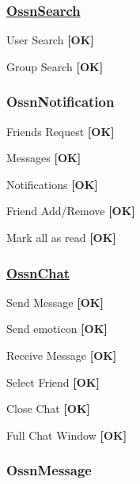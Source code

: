 \subsubsection*{\hyperlink{class_ossn_search}{Ossn\+Search}}


\begin{DoxyItemize}
\item User Search {\bfseries \mbox{[}OK\mbox{]}}
\item Group Search {\bfseries \mbox{[}OK\mbox{]}}
\end{DoxyItemize}

\subsubsection*{Ossn\+Notification}


\begin{DoxyItemize}
\item Friends Request {\bfseries \mbox{[}OK\mbox{]}}
\item Messages {\bfseries \mbox{[}OK\mbox{]}}
\item Notifications {\bfseries \mbox{[}OK\mbox{]}}
\item Friend Add/\+Remove {\bfseries \mbox{[}OK\mbox{]}}
\item Mark all as read {\bfseries \mbox{[}OK\mbox{]}}
\end{DoxyItemize}

\subsubsection*{\hyperlink{class_ossn_chat}{Ossn\+Chat}}


\begin{DoxyItemize}
\item Send Message {\bfseries \mbox{[}OK\mbox{]}}
\item Send emoticon {\bfseries \mbox{[}OK\mbox{]}}
\item Receive Message {\bfseries \mbox{[}OK\mbox{]}}
\item Select Friend {\bfseries \mbox{[}OK\mbox{]}}
\item Close Chat {\bfseries \mbox{[}OK\mbox{]}}
\item Full Chat Window {\bfseries \mbox{[}OK\mbox{]}}
\end{DoxyItemize}

\subsubsection*{Ossn\+Message}


